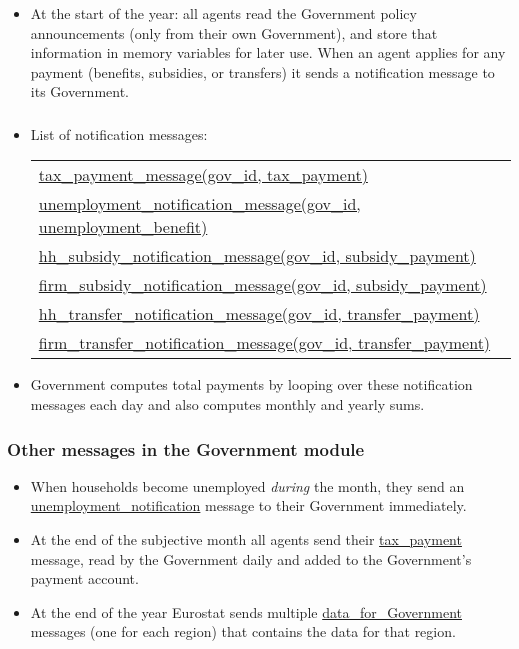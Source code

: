 \documentclass{beamer}
\begin{document}
\begin{frame}{}
\frametitle{}
\begin{itemize}
\item At the start of the year: all agents read the Government policy
announcements (only from their own Government), and store that information
in memory variables for later use. When an agent applies for any payment
(benefits, subsidies, or transfers) it sends a notification message to its
Government.
\end{itemize}
\end{frame}

\begin{frame}{}
\frametitle{}
\begin{itemize}
\item List of notification messages:
\begin{tabular}{l}
\hspace{-0.5cm}\small\url{tax_payment_message(gov_id, tax_payment)} \\
\hspace{-0.5cm}\small\url{unemployment_notification_message(gov_id, unemployment_benefit)} \\
\hspace{-0.5cm}\small\url{hh_subsidy_notification_message(gov_id, subsidy_payment)} \\
\hspace{-0.5cm}\small\url{firm_subsidy_notification_message(gov_id, subsidy_payment)} \\
\hspace{-0.5cm}\small\url{hh_transfer_notification_message(gov_id, transfer_payment)} \\
\hspace{-0.5cm}\small\url{firm_transfer_notification_message(gov_id, transfer_payment)}%
\end{tabular}

\item Government computes total payments by looping over these notification
messages each day and also computes monthly and yearly sums.
\end{itemize}
\end{frame}

\begin{frame}{}
\frametitle{Other messages in the Government module}
\begin{itemize}
\item When households become unemployed \emph{during} the month, they send
an \url{unemployment_notification} message to their Government immediately.
\item At the end of the subjective month all agents send their \url{tax_payment}
message, read by the Government daily and added to the Government's payment
account.
\item At the end of the year Eurostat sends multiple %
\url{data_for_Government} messages (one for each region) that contains the
data for that region.
\end{itemize}
\end{frame}
\end{document}
